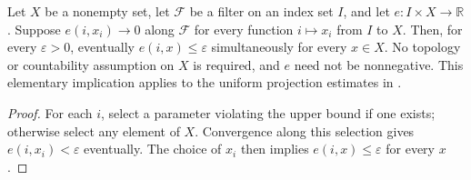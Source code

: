 \begin{lemma}
    \label{thm:uniform_upper_bound_all_selections}
    \leanok
    Let $X$ be a nonempty set, let $\mathcal F$ be a filter on an index set
    $I$, and let $e:I\times X\to\mathbb R$.
    Suppose $e(i,x_i)\to0$ along $\mathcal F$ for every function
    $i\mapsto x_i$ from $I$ to $X$. Then, for every $\varepsilon>0$,
    eventually $e(i,x)\leq\varepsilon$ simultaneously for every $x\in X$.
    No topology or countability assumption on $X$ is required, and $e$
    need not be nonnegative. This elementary implication applies to the
    uniform projection estimates in
    \cite[Lemma~commutation(ii)]{Nachtergaele1996Spectral}.
\end{lemma}
\begin{proof}\leanok
    For each $i$, select a parameter violating the upper bound if one exists;
    otherwise select any element of $X$.
    Convergence along this selection gives $e(i,x_i)<\varepsilon$ eventually.
    The choice of $x_i$ then implies $e(i,x)\leq\varepsilon$ for every $x$.
\end{proof}
